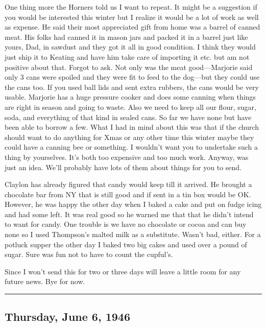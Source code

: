 \documentclass[
]{book}
\begin{document}
One thing more the Horners told us I want to repeat. It might be a suggestion if you would be interested this winter but I realize it would be a lot of work as well as expense. He said their most appreciated gift from home was a barrel of canned meat. His folks had canned it in mason jars and packed it in a barrel just like yours, Dad, in sawdust and they got it all in good condition. I think they would just ship it to Keating and have him take care of importing it etc. but am not positive about that. Forgot to ask. Not only was the meat good---Marjorie said only 3 cans were spoiled and they were fit to feed to the dog---but they could use the cans too. If you used ball lids and sent extra rubbers, the cans would be very usable. Marjorie has a huge pressure cooker and does some canning when things are right in season and going to waste. Also we need to keep all our flour, sugar, soda, and everything of that kind in sealed cans. So far we have none but have been able to borrow a few. What I had in mind about this was that if the church should want to do anything for Xmas or any other time this winter maybe they could have a canning bee or something. I wouldn't want you to undertake such a thing by yourselves. It's both too expensive and too much work. Anyway, was just an idea. We'll probably have lots of them about things for you to send.

Claylon has already figured that candy would keep till it arrived. He brought a chocolate bar from NY that is still good and if sent in a tin box would be OK. However, he was happy the other day when I baked a cake and put on fudge icing and had some left. It was real good so he warned me that that he didn't intend to want for candy. One trouble is we have no chocolate or cocoa and can buy none so I used Thompson's malted milk as a substitute. Wasn't bad, either. For a potluck supper the other day I baked two big cakes and used over a pound of sugar. Sure was fun not to have to count the cupful's.

Since I won't send this for two or three days will leave a little room for any future news. Bye for now.

\begin{center}\rule{0.5\linewidth}{0.5pt}\end{center}

\hypertarget{thursday-june-6-1946}{%
\subsection{Thursday, June 6, 1946}\label{thursday-june-6-1946}}
\end{document}
